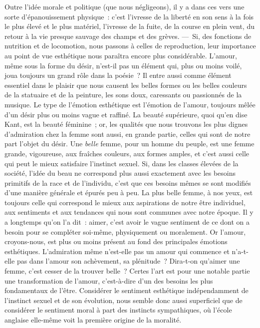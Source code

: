 \documentclass[french,twoside]{book} %
\begin{document}
\noindent Outre l’idée morale et politique (que nous négligeons),  il y a dans ces vers une sorte d’épanouissement physique : c’est l’ivresse de la liberté en son sens à la fois le plus élevé et le plus matériel, l’ivresse de la fuite, de la course en plein vent, du retour à la vie presque sauvage des champs et des grèves. — Si, des fonctions de nutrition et de locomotion, nous passons à celles de reproduction, leur importance au point de vue esthétique nous paraîtra encore plus considérable. L’amour, même sous la forme du désir, n’est-il pas un élément qui, plus ou moins voilé, joua toujours un grand rôle dans la poésie ? Il entre aussi comme élément essentiel dans le plaisir que nous causent les belles formes ou les belles couleurs de la statuaire et de la peinture, les sons doux, caressants ou passionnés de la musique. Le type de l’émotion esthétique est l’émotion de l’amour, toujours mêlée d’un désir plus ou moins vague et raffiné. La beauté supérieure, quoi qu’en dise Kant, est la beauté féminine ; or, les qualités que nous trouvons les plus dignes d’admiration chez la femme sont aussi, en grande partie, celles qui sont de notre part l’objet du désir. Une \emph{belle} femme, pour un homme du peuple, est une femme grande, vigoureuse, aux fraîches couleurs, aux formes amples, et c’est aussi celle qui peut le mieux satisfaire l’instinct sexuel. Si, dans les classes élevées de la société, l’idée du beau ne correspond plus aussi exactement avec les besoins primitifs de la race et de l’individu, c’est que ces besoins mêmes se sont modifiés d’une manière générale et épurés peu à peu. La plus belle femme, à nos yeux, est toujours celle qui correspond le mieux aux aspirations de notre être individuel, aux sentiments et aux  tendances qui nous sont communes avec notre époque. Il y a longtemps qu’on l’a dit : aimer, c’est avoir le vague sentiment de ce dont on a besoin pour se compléter soi-même, physiquement ou moralement. Or l’amour, croyons-nous, est plus ou moins présent au fond des principales émotions esthétiques. L’admiration même n’est-elle pas un amour qui commence et n’a-t-elle pas dans l’amour son achèvement, sa plénitude ? Dira-t-on qu’aimer une femme, c’est cesser de la trouver belle ? Certes l’art est pour une notable partie une transformation de l’amour, c’est-à-dire d’un des besoins les plus fondamentaux de l’être. Considérer le sentiment esthétique indépendamment de l’instinct sexuel et de son évolution, nous semble donc aussi superficiel que de considérer le sentiment moral à part des instincts sympathiques, où l’école anglaise elle-même voit la première origine de la moralité.\par
\end{document}
